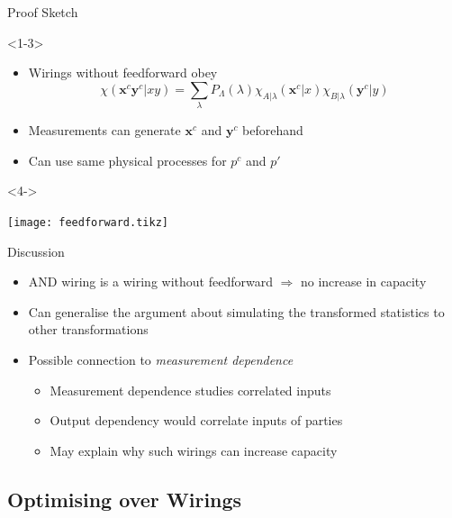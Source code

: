 \documentclass[xcolor=dvipsnames]{beamer}
\newcommand{\?}{\mathrel{?}} %
\newcommand{\cvec}[1]{\boldsymbol{\mathbf{#1}}}    %
\begin{document}
\begin{frame}{Proof Sketch}
  \begin{onlyenv}<1-3>
    \begin{itemize}[<+->]
      \item Wirings without feedforward obey
        \[ \chi(\cvec{x}^c\cvec{y}^c|xy) = \sum_{\lambda} P_{\Lambda}(\lambda) \chi_{A|\lambda}(\cvec{x}^c|x) \chi_{B|\lambda}(\cvec{y}^c|y) \]
      \item Measurements can generate \(\cvec{x}^c\) and \(\cvec{y}^c\) beforehand
      \item Can use same physical processes for \(p^c\) and \(p'\)
    \end{itemize}
  \end{onlyenv}
  \begin{onlyenv}<4->
    \begin{center}
      \texttt{[image: feedforward.tikz]}
    \end{center}
  \end{onlyenv}
\end{frame}


\begin{frame}{Discussion}
  \begin{itemize}[<+->]
    \item AND wiring is a wiring without feedforward \(\Rightarrow\) no increase in capacity
    \item Can generalise the argument about simulating the transformed statistics to other transformations
    \item Possible connection to \emph{measurement dependence}
      \begin{itemize}
        \item Measurement dependence studies correlated inputs
        \item Output dependency would correlate inputs of parties
        \item May explain why such wirings can increase capacity
      \end{itemize}
  \end{itemize}
\end{frame}

\subsection{Optimising over Wirings}
\end{document}
